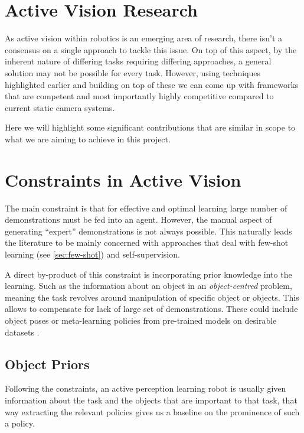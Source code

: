 \section{Active Vision Research}

As active vision within robotics is an emerging area of research, there isn't a consensus on a single approach to tackle this issue. On top of this aspect, by the inherent nature of differing tasks requiring differing approaches, a general solution may not be possible for every task. However, using techniques highlighted earlier and building on top of these we can come up with frameworks that are competent and most importantly highly competitive compared to current static camera systems.

Here we will highlight some significant contributions that are similar in scope to what we are aiming to achieve in this project.

\section{Constraints in Active Vision}
The main constraint is that for effective and optimal learning large number of demonstrations must be fed into an agent. However, the manual aspect of generating ``expert'' demonstrations is not always possible. This naturally leads the literature to be mainly concerned with approaches that deal with few-shot learning (see \ref{sec:few-shot}) and self-supervision.

A direct by-product of this constraint is incorporating prior knowledge into the learning. Such as the information about an object in an \emph{object-centred} problem, meaning the task revolves around manipulation of specific object or objects. This allows to compensate for lack of large set of demonstrations. These could include object poses \cite{huang2018generalisedTPlearning, hu2023modelpredictiveoptimisation} or meta-learning policies from pre-trained models on desirable datasets \cite{finn2017oneshotvisualimitationlearning, mandi2022}.


\subsection{Object Priors}
Following the constraints, an active perception learning robot is usually given information about the task and the objects that are important to that task, that way extracting the relevant policies gives us a baseline on the prominence of such a policy.

